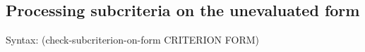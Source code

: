\subsection{Processing subcriteria on the unevaluated form}
\label{sec:subcriteria-form}
{\ttfamily\begin{tabbing}
\textrm{Syntax: }(check-subcriterion-on-form CRITERION FORM)
\end{tabbing}}%
%

